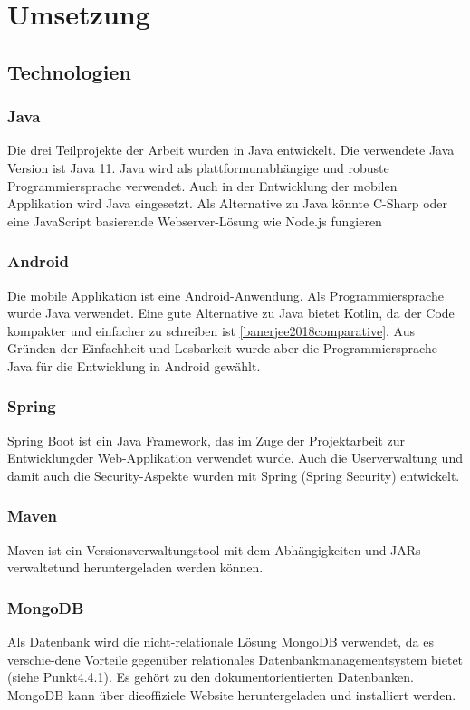 \chapter{Umsetzung}
\label{chap:Umsetzung}

\section{Technologien}
\subsection{Java}
Die drei Teilprojekte der Arbeit wurden in Java entwickelt. Die verwendete Java Version ist Java 11. Java wird als plattformunabhängige und robuste Programmiersprache verwendet. Auch in der Entwicklung der mobilen Applikation wird Java eingesetzt. Als Alternative zu Java könnte C-Sharp oder eine JavaScript basierende Webserver-Lösung wie Node.js fungieren
\subsection{Android}
Die mobile Applikation ist eine Android-Anwendung. Als Programmiersprache wurde Java verwendet. Eine gute Alternative zu Java bietet Kotlin, da der Code kompakter und einfacher zu schreiben ist \ref{banerjee2018comparative}. Aus Gründen der Einfachheit und Lesbarkeit wurde aber die Programmiersprache Java für die Entwicklung in Android gewählt.
\subsection{Spring}
Spring Boot ist ein Java Framework, das im Zuge der Projektarbeit zur Entwicklungder Web-Applikation verwendet wurde. Auch die Userverwaltung und damit auch die Security-Aspekte wurden mit Spring (Spring Security) entwickelt.
\subsection{Maven}
Maven ist ein Versionsverwaltungstool mit dem Abhängigkeiten und JARs verwaltetund heruntergeladen werden können.
\subsection{MongoDB}
Als Datenbank wird die nicht-relationale Lösung MongoDB verwendet, da es verschie-dene Vorteile gegenüber relationales Datenbankmanagementsystem bietet (siehe Punkt4.4.1). Es gehört zu den dokumentorientierten Datenbanken. MongoDB kann über dieoffiziele Website heruntergeladen und installiert werden.
